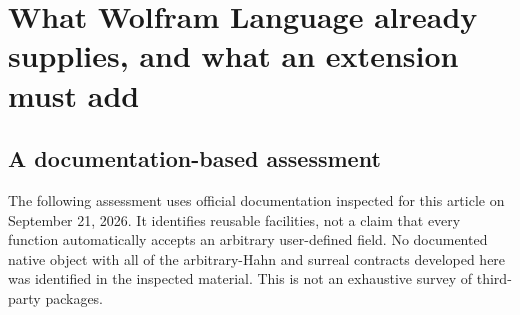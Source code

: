 \documentclass[11pt,letterpaper]{article}
\numberwithin{equation}{section}
\theoremstyle{definition}
\theoremstyle{remark}\newtheorem{remark}[theorem]{Remark}
\begin{document}
\section{What Wolfram Language already supplies, and what an extension must add}
\label{sec:wolfram}

\subsection{A documentation-based assessment}
The following assessment uses official documentation inspected for this
article on September 21, 2026. It identifies reusable facilities, not a claim
that every function automatically accepts an arbitrary user-defined field.
No documented native object with all of the arbitrary-Hahn and surreal
contracts developed here was identified in the inspected material. This is
not an exhaustive survey of third-party packages.
\end{document}

